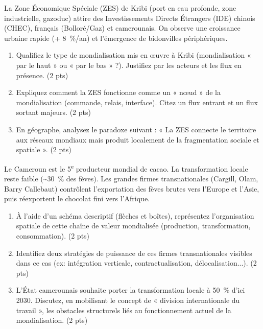 \documentclass[11pt]{article}
\begin{document}
\begin{exercice}
La Zone Économique Spéciale (ZES) de Kribi (port en eau profonde, zone industrielle, gazoduc) attire des Investissements Directs Étrangers (IDE) chinois (CHEC), français (Bolloré/Gaz) et camerounais. On observe une croissance urbaine rapide (+ \SI{8}{\percent}/an) et l'émergence de bidonvilles périphériques.

\begin{enumerate}
    \item Qualifiez le type de mondialisation mis en œuvre à Kribi (mondialisation « par le haut » ou « par le bas » ?). Justifiez par les acteurs et les flux en présence. (2 pts)
    \item Expliquez comment la ZES fonctionne comme un « nœud » de la mondialisation (commande, relais, interface). Citez un flux entrant et un flux sortant majeurs. (2 pts)
    \item En géographe, analysez le paradoxe suivant : « La ZES connecte le territoire aux réseaux mondiaux mais produit localement de la fragmentation sociale et spatiale ». (2 pts)
\end{enumerate}
\end{exercice}

\begin{exercice}
Le Cameroun est le 5\textsuperscript{e} producteur mondial de cacao. La transformation locale reste faible (\textasciitilde \SI{30}{\percent} des fèves). Les grandes firmes transnationales (Cargill, Olam, Barry Callebaut) contrôlent l'exportation des fèves brutes vers l'Europe et l'Asie, puis réexportent le chocolat fini vers l'Afrique.

\begin{enumerate}
    \item À l'aide d'un schéma descriptif (flèches et boîtes), représentez l'organisation spatiale de cette chaîne de valeur mondialisée (production, transformation, consommation). (2 pts)
    \item Identifiez deux stratégies de puissance de ces firmes transnationales visibles dans ce cas (ex: intégration verticale, contractualisation, délocalisation...). (2 pts)
    \item L'État camerounais souhaite porter la transformation locale à \SI{50}{\percent} d'ici 2030. Discutez, en mobilisant le concept de « division internationale du travail », les obstacles structurels liés au fonctionnement actuel de la mondialisation. (2 pts)
\end{enumerate}
\end{exercice}
\end{document}
